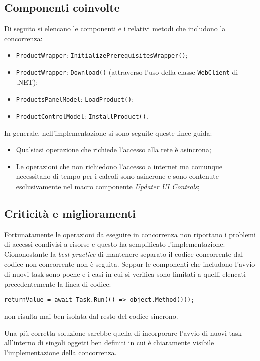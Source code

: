 \documentclass[../RelazioneFinale.tex]{subfiles}
\begin{document}
			\subsection{Componenti coinvolte}
				Di seguito si elencano le componenti e i relativi metodi che includono la concorrenza:
				\begin{itemize}
					\item[] \verb|ProductWrapper|: \lstinline|InitializePrerequisitesWrapper()|;
					\item[] \verb|ProductWrapper|: \lstinline|Download()| (attraverso l'uso della classe \verb|WebClient| di .NET);
					\item[] \verb|ProductsPanelModel|: \lstinline|LoadProduct()|;
					\item[] \verb|ProductControlModel|: \lstinline|InstallProduct()|.
				\end{itemize}
			
			In generale, nell'implementazione si sono seguite queste linee guida:
				\begin{itemize}
					\item Qualsiasi operazione che richiede l'accesso alla rete è asincrona;
					\item Le operazioni che non richiedono l'accesso a internet ma comunque necessitano di tempo per i calcoli sono asincrone e sono contenute esclusivamente nel macro componente \emph{Updater UI Controls};
				\end{itemize}
				
			\subsection{Criticità e miglioramenti}
				Fortunatamente le operazioni da eseguire in concorrenza non riportano i problemi di accessi condivisi a risorse e questo ha semplificato l'implementazione. Ciononostante la \emph{best practice} di mantenere separato il codice concorrente dal codice non concorrente non è seguita. Seppur le componenti che includono l'avvio di nuovi task sono poche e i casi in cui si verifica sono limitati a quelli elencati precedentemente la linea di codice:
				\begin{lstlisting}
returnValue = await Task.Run(() => object.Method()));				
				\end{lstlisting}
		non risulta mai ben isolata dal resto del codice sincrono.
		
		Una più corretta soluzione sarebbe quella di incorporare l'avvio di nuovi task all'interno di singoli oggetti ben definiti in cui è chiaramente visibile l'implementazione della concorrenza.
			
\end{document}
